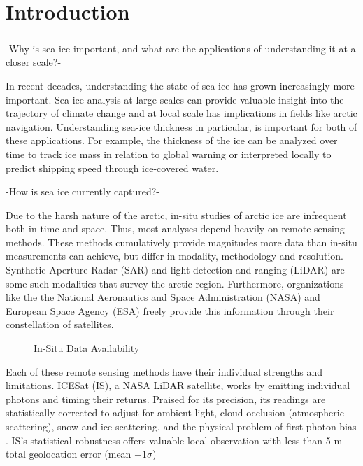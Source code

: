 \chapter{Introduction}
\label{sec:Introduction}

\paragraph{}
-Why is sea ice important, and what are the applications of understanding it at a closer scale?-

\indent In recent decades, understanding the state of sea ice has grown increasingly more important. Sea ice analysis at large scales can provide valuable insight into the trajectory of climate change and at local scale has implications in fields like arctic navigation. Understanding sea-ice thickness in particular, is important for both of these applications.  For example, the thickness of the ice can be analyzed over time to track ice mass in relation to global warning or interpreted locally to predict shipping speed through ice-covered water. \cite{sea-ice-properties}

-How is sea ice currently captured?- 

\indent Due to the harsh nature of the arctic, in-situ studies of arctic ice are infrequent both in time and space. Thus, most analyses depend heavily on remote sensing methods. These methods cumulatively provide magnitudes more data than in-situ measurements can achieve, but differ in modality, methodology and resolution. Synthetic Aperture Radar (SAR) and light detection and ranging (LiDAR) are some such modalities that survey the arctic region. Furthermore, organizations like the the National Aeronautics and Space Administration (NASA) and European Space Agency (ESA) freely provide this information through their constellation of satellites.

\begin{figure}[htb]
	\centering
	\caption{In-Situ Data Availability}
	\label{fig:foobar}
\end{figure}

Each of these remote sensing methods have their individual strengths and limitations.
 ICESat (IS), a NASA LiDAR satellite, works by emitting individual photons and timing their returns.
  Praised for its precision, its readings are statistically corrected to adjust for ambient light, cloud occlusion (atmospheric scattering), snow and ice scattering, and the physical problem of first-photon bias \cite{ICESat-2-ATL10-Product}.
	 IS's statistical robustness offers valuable local observation with less than 5 m total geolocation error (mean \(+ 1\sigma\))\cite{ICESat-2-Horizontal-Accuracy}

